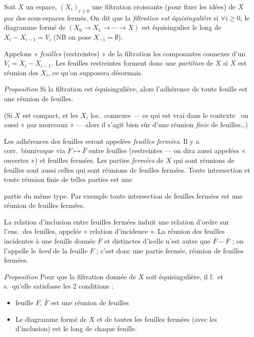 \documentclass[11pt,a4paper]{article}
\begin{document}

Soit $X$ un espace, $(X_i)_{i \geq 0}$ une filtration croissante (pour fixer
les idées) de $X$ par des sous-espaces fermés. On dit que la
\emph{filtration est équisingulière} si $\forall i \geq 0$, le diagramme
formé de $(X_0 \to X_1 \to \cdots \to X)$ est équisingulier le long de
$X_i - X_{i-1} = V_i$ (NB on pose $X_{-1} = \emptyset$).

Appelons « \emph{feuilles} (restreintes) » de la filtration les
composantes connexes d'un $V_i = X_i - X_{i-1}$. Les feuilles restreintes
forment donc une \emph{partition} de $X$ si $X$ est réunion des $X_i$, ce
qu'on supposera désormais.

\emph{Proposition} Si la  filtration est
équisingulière, alors l'adhérence de toute feuille est une réunion de
feuilles.

(Si $X$ est compact, et les $X_i$ loc.\ connexes --- ce qui est vrai dans
le contexte \ ou aussi « par morceaux » --- alors
il s'agit bien sûr d'une réunion \emph{finie} de feuilles\ldots)

Les adhérences des feuilles seront appelées \emph{feuilles fermées}. Il y a
corr.\ biunivoque via $F \mapsto \overline{F}$ entre feuilles (restreintes
--- on dira aussi  appelées « ouvertes ») et feuilles
fermées. Les parties \emph{fermées} de $X$ qui sont réunions de feuilles
sont aussi celles qui sont réunions de feuilles fermées. Toute intersection
et toute réunion finie de telles parties est une

partie du même type. Par exemple toute intersection de feuilles fermées
est une réunion de feuilles fermées.

La relation d'inclusion entre feuilles fermées induit une relation d'ordre
sur l'ens.\ des feuilles, appelée « relation d'incidence ». La réunion des
feuilles incidentes à une feuille donnée $F$ et distinctes d'icelle n'est
autre que $\overline{F} - F$ ; on l'appelle le \emph{bord} de la feuille
$F$ ; c'est donc une partie fermée, réunion de feuilles fermées.

\emph{Proposition} Pour que la filtration donnée de $X$ soit
équisingulière, il f.\ et s.\ qu'elle satisfasse les 2 conditions :
\begin{itemize}
  \item[a)] \struck{$\forall$} feuille $F$, $\overline{F}$ est une réunion
  de feuilles
  \item[b)] Le diagramme formé de $X$ et de toutes les feuilles fermées
  (avec les  
  d'inclusion) est \struck{\ill{}}  le long de chaque
  feuille.
\end{itemize}
\end{document}

